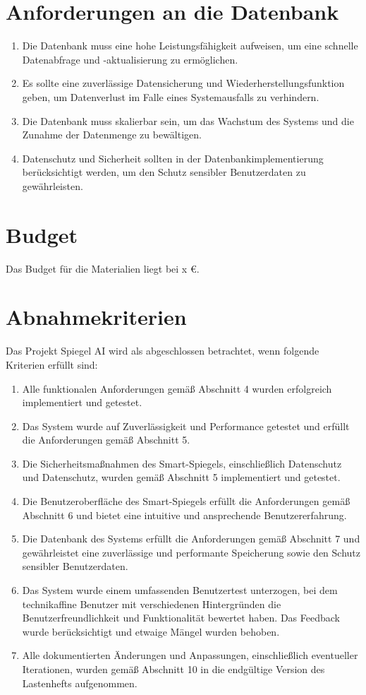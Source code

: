 \documentclass{article}
\begin{document}
\section{Anforderungen an die Datenbank}
\begin{enumerate}[label=\textbf{D\arabic*:}]
    \item Die Datenbank muss eine hohe Leistungsfähigkeit aufweisen, um eine schnelle Datenabfrage und -aktualisierung zu ermöglichen.
    \item Es sollte eine zuverlässige Datensicherung und Wiederherstellungsfunktion geben, um Datenverlust im Falle eines Systemausfalls zu verhindern.
    \item Die Datenbank muss skalierbar sein, um das Wachstum des Systems und die Zunahme der Datenmenge zu bewältigen.
    \item Datenschutz und Sicherheit sollten in der Datenbankimplementierung berücksichtigt werden, um den Schutz sensibler Benutzerdaten zu gewährleisten.
\end{enumerate}

\section{Budget}
Das Budget für die Materialien liegt bei x €.

\section{Abnahmekriterien}
Das Projekt Spiegel AI wird als abgeschlossen betrachtet, wenn folgende Kriterien erfüllt sind:

\begin{enumerate}
    \item Alle funktionalen Anforderungen gemäß Abschnitt 4 wurden erfolgreich implementiert und getestet.
    \item Das System wurde auf Zuverlässigkeit und Performance getestet und erfüllt die Anforderungen gemäß Abschnitt 5.
    \item Die Sicherheitsmaßnahmen des Smart-Spiegels, einschließlich Datenschutz und Datenschutz, wurden gemäß Abschnitt 5 implementiert und getestet.
    \item Die Benutzeroberfläche des Smart-Spiegels erfüllt die Anforderungen gemäß Abschnitt 6 und bietet eine intuitive und ansprechende Benutzererfahrung.
    \item Die Datenbank des Systems erfüllt die Anforderungen gemäß Abschnitt 7 und gewährleistet eine zuverlässige und performante Speicherung sowie den Schutz sensibler Benutzerdaten.
    \item Das System wurde einem umfassenden Benutzertest unterzogen, bei dem technikaffine Benutzer mit verschiedenen Hintergründen die Benutzerfreundlichkeit und Funktionalität bewertet haben. Das Feedback wurde berücksichtigt und etwaige Mängel wurden behoben.
    \item Alle dokumentierten Änderungen und Anpassungen, einschließlich eventueller Iterationen, wurden gemäß Abschnitt 10 in die endgültige Version des Lastenhefts aufgenommen.
\end{enumerate}
\end{document}
